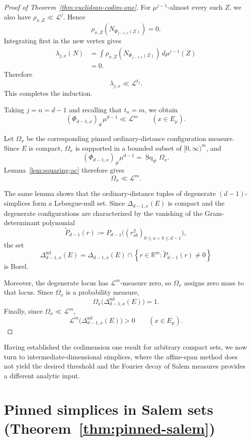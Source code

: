 \documentclass[11pt]{article}
\theoremstyle{remark}
\newcommand{\R}{\mathbb R}
\newcommand{\cL}{\mathcal L}
\numberwithin{equation}{section}
\newcommand{\1}{\mathbf 1}
\begin{document}
\begin{proof}[Proof of Theorem~\ref{thm:euclidean-codim-one}]
For \(\mu^{j-1}\)-almost every such \(Z\), we also have
\(\rho_{x,Z}\ll\cL^j\). Hence
\[
\rho_{x,Z}
\left(
N_{\Phi_{j-1,x}(Z)}
\right)
=0.
\]
Integrating first in the new vertex gives
\[
\begin{aligned}
\lambda_{j,x}(N)
&=
\int
\rho_{x,Z}
\left(
N_{\Phi_{j-1,x}(Z)}
\right)
\,d\mu^{j-1}(Z)\\
&=0.
\end{aligned}
\]
Therefore
\[
\lambda_{j,x}\ll\cL^{t_j}.
\]
This completes the induction.

Taking \(j=n=d-1\) and recalling that \(t_n=m\), we obtain
\[
(\Phi_{d-1,x})_\#\mu^{d-1}
\ll\cL^m
\qquad
(x\in E_\mu).
\]

Let \(\Omega_x\) be the corresponding pinned ordinary-distance
configuration measure. Since \(E\) is compact, \(\Omega_x\) is
supported in a bounded subset of \([0,\infty)^m\), and
\[
(\Phi_{d-1,x})_\#\mu^{d-1}
=
\operatorname{Sq}_\#\Omega_x.
\]
Lemma~\ref{lem:squaring-ac} therefore gives
\[
\Omega_x\ll\cL^m.
\]

The same lemma shows that the ordinary-distance tuples of degenerate
\((d-1)\)-simplices form a Lebesgue-null set. Since
\(\Delta_{d-1,x}(E)\) is compact and the degenerate configurations are
characterized by the vanishing of the Gram-determinant polynomial
\[
\widetilde P_{d-1}(r)
:=
P_{d-1}
\bigl(
(r_{ab}^2)_{0\leq a<b\leq d-1}
\bigr),
\]
the set
\[
\Delta^{\mathrm{nd}}_{d-1,x}(E)
=
\Delta_{d-1,x}(E)
\cap
\left\{
r\in\R^m:
\widetilde P_{d-1}(r)\neq0
\right\}
\]
is Borel.

Moreover, the degenerate locus has \(\cL^m\)-measure zero, so
\(\Omega_x\) assigns zero mass to that locus. Since \(\Omega_x\) is a
probability measure,
\[
\Omega_x
\bigl(
\Delta^{\mathrm{nd}}_{d-1,x}(E)
\bigr)
=
1.
\]
Finally, since \(\Omega_x\ll\cL^m\),
\[
\cL^m
\bigl(
\Delta^{\mathrm{nd}}_{d-1,x}(E)
\bigr)
>0
\qquad
(x\in E_\mu).
\]
\end{proof}



Having established the codimension one result for arbitrary compact sets, we now turn to intermediate-dimensional simplices, where the affine-span method does not yield the desired threshold and the Fourier decay of Salem measures provides a different analytic input.





\section{Pinned simplices in Salem sets (Theorem~\ref{thm:pinned-salem})}
\label{sec:pinned-salem}
\end{document}
